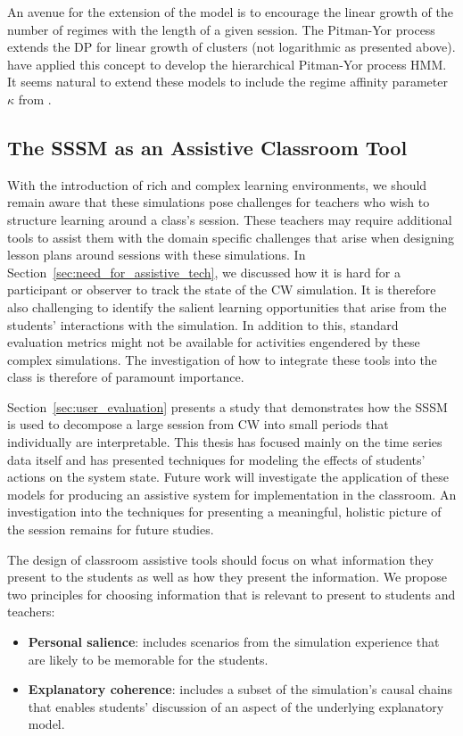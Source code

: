 An avenue for the extension of the \cite{fox2009nonparametric} model is to encourage the linear growth of the number of regimes with the length of a given session. The Pitman-Yor process~\citep{pitman1997two} extends the DP for linear growth of clusters (not logarithmic as presented above). \cite{blunsom2011hierarchical} have applied this concept to develop the hierarchical Pitman-Yor process HMM. It seems natural to extend these models to include the regime affinity parameter $\kappa$ from \cite{fox2007hierarchical,fox2009nonparametric}.

\subsection{The SSSM as an Assistive Classroom Tool}\label{sec:class-assistive}
With the introduction of rich and complex learning environments, we should remain aware that these simulations pose challenges for teachers who wish to structure learning around a class's session. These teachers may require additional tools to assist them with the domain specific challenges that arise when designing lesson plans around sessions with these simulations. In Section~\ref{sec:need_for_assistive_tech}, we discussed how it is hard for a participant or observer to track the state of the CW simulation. It is therefore also challenging to identify the salient learning opportunities that arise from the students' interactions with the simulation. In addition to this, standard evaluation metrics might not be available for activities engendered by these complex simulations. The investigation of how to integrate these tools into the class is therefore of paramount importance.

Section~\ref{sec:user_evaluation} presents a study that demonstrates how the SSSM is used to decompose a large session from CW into small periods that individually are interpretable. This thesis has focused mainly on the time series data itself and has presented techniques for modeling the effects of students' actions on the system state. Future work will investigate the application of these models for producing an assistive system for implementation in the classroom. An investigation into the techniques for presenting a meaningful, holistic picture of the session remains for future studies.

The design of classroom assistive tools should focus on what information they present to the students as well as how they present the information. We propose two principles for choosing information that is relevant to present to students and teachers:
\begin{itemize}
  \item \textbf{Personal salience}: includes scenarios from the simulation experience that are likely to be memorable for the students.
  \item \textbf{Explanatory coherence}: includes a subset of the simulation’s causal chains that enables students’ discussion of an aspect of the underlying explanatory model.
\end{itemize}

